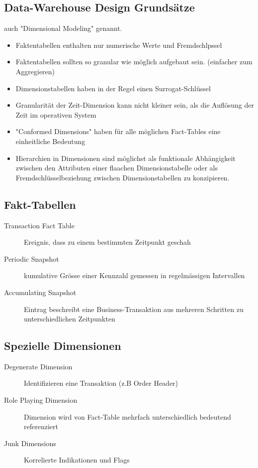 \documentclass[../Main.tex]{subfiles}
\begin{document}
\subsection{Data-Warehouse Design Grundsätze}
auch "Dimensional Modeling" genannt.
\begin{itemize}
    \item Faktentabellen enthalten nur numerische Werte und Fremdschlpssel
    \item Faktentabellen sollten so granular wie möglich aufgebaut sein. (einfacher zum Aggregieren)
    \item Dimensionstabellen haben in der Regel einen Surrogat-Schlüssel
    \item Granularität der Zeit-Dimension kann nicht kleiner sein, als die Auflösung der Zeit im operativen System
    \item "Conformed Dimensions" haben für alle möglichen Fact-Tables eine einheitliche Bedeutung
    \item Hierarchien in Dimensionen sind möglichst als funktionale Abhängigkeit zwischen den Attributen einer
    flaachen Dimensionstabelle oder als Fremdschlüsselbeziehung zwischen Dimensionstabellen zu konzipieren.
\end{itemize}

\subsection{Fakt-Tabellen}
\begin{description}
    \item[Transaction Fact Table] Ereignis, dass zu einem bestimmten Zeitpunkt geschah
    \item[Periodic Snapshot] kumulative Grösse einer Kennzahl gemessen in regelmässigen Intervallen
    \item[Accumulating Snapshot] Eintrag beschreibt eine Business-Transaktion aus mehreren Schritten zu unterschiedlichen Zeitpunkten   
\end{description}

\subsection{Spezielle Dimensionen}
\begin{description}
    \item[Degenerate Dimension] Identifizieren eine Transaktion (z.B Order Header)
    \item[Role Playing Dimension] Dimension wird von Fact-Table mehrfach unterschiedlich bedeutend referenziert
    \item[Junk Dimensions] Korrelierte Indikationen und Flags 
\end{description}
\end{document}
